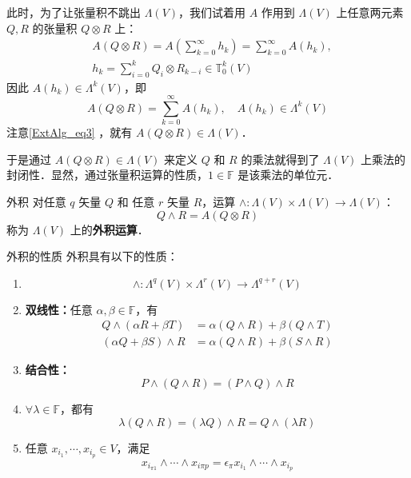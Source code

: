 此时，为了让张量积不跳出 $\Lambda(V)$，我们试着用 $A$ 作用到 $\Lambda(V)$ 上任意两元素 $Q,R$ 的张量积 $Q\otimes R$ 上：
\begin{equation}
\begin{aligned}
&A(Q\otimes R)=A(\sum_{k=0}^\infty h_k)=\sum_{k=0}^\infty  A(h_k),\\
&h_k=\sum_{i=0}^k Q_i\otimes R_{k-i}\in\mathbb T_0^k(V)
\end{aligned}
\end{equation}
因此 $A(h_k)\in \Lambda^{k}(V)$，即
\begin{equation}
A(Q\otimes R)=\sum_{k=0}^\infty  A(h_k),\quad A(h_k)\in\Lambda^k(V)
\end{equation}
注意\autoref{ExtAlg_eq3} ，就有 $A(Q\otimes R)\in\Lambda(V)$．

于是通过 $A(Q\otimes R)\in\Lambda(V)$ 来定义 $Q$ 和 $R$ 的乘法就得到了 $\Lambda(V)$ 上乘法的封闭性．显然，通过张量积运算的性质，$1\in\mathbb F$ 是该乘法的单位元．
\begin{definition}{外积}\label{ExtAlg_def1}
对任意 $q$ 矢量 $Q$ 和 任意 $r$ 矢量 $R$，运算 $\wedge:\Lambda(V)\times\Lambda(V)\rightarrow\Lambda(V)$：
\begin{equation}
Q\wedge R=A(Q\otimes R)
\end{equation}
称为 $\Lambda(V)$ 上的\textbf{外积运算}．
\end{definition}
\begin{theorem}{外积的性质}
外积具有以下的性质：
\begin{enumerate}
\item \begin{equation}\label{ExtAlg_eq1}
\wedge:\Lambda^q(V)\times\Lambda^r(V)\rightarrow\Lambda^{q+r}(V)
\end{equation}
\item \textbf{双线性：}任意 $\alpha,\beta\in\mathbb F$，有
\begin{equation}
\begin{aligned}
Q\wedge(\alpha R+\beta T)&=\alpha(Q\wedge R)+\beta(Q\wedge T)\\
(\alpha Q+\beta S)\wedge R&=\alpha (Q\wedge R)+\beta (S\wedge R)
\end{aligned}
\end{equation}
\item \textbf{结合性：}
\begin{equation}
P\wedge (Q\wedge R)=(P\wedge Q)\wedge R
\end{equation}
\item $\forall \lambda\in\mathbb F$，都有
\begin{equation}\label{ExtAlg_eq4}
\lambda(Q\wedge R)=(\lambda Q)\wedge R=Q\wedge(\lambda R)
\end{equation}

\item 任意 $x_{i_1},\cdots,x_{i_p}\in V$，满足
\begin{equation}
x_{i_{\pi 1}}\wedge\cdots \wedge x_{i\pi p}=\epsilon_\pi x_{i_1}\wedge\cdots\wedge x_{i_p}
\end{equation}

\end{enumerate}

\end{theorem}
